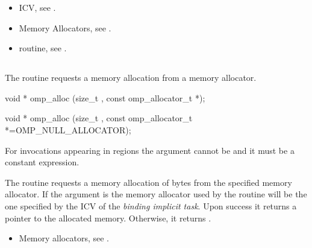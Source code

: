 \crossreferences
\begin{itemize}
\item {} ICV, see .
\item Memory Allocators, see .
\item {} routine, see .
\end{itemize}


\newpage %
\vspace{3\baselineskip}
\ccppspecificstart
\vspace{-3\baselineskip}
\subsection{}
\label{subsec:omp_alloc}

\summary
The  routine requests a memory allocation from a memory allocator.

\format
\begin{cspecific}
\begin{boxedcode}
void * omp_alloc (size_t , const omp_allocator_t *);
\end{boxedcode}
\end{cspecific}
\begin{cppspecific}
\begin{boxedcode}
void * omp_alloc (size_t , 
           const omp_allocator_t *=OMP_NULL_ALLOCATOR);
\end{boxedcode}
\end{cppspecific}

\constraints

For  invocations appearing in  regions the  argument cannot be  and it must be a constant expression.

\effect

The  routine requests a memory allocation of  bytes from the specified memory allocator. If the  argument is 
 the memory allocator used by the routine will be the one specified by the  ICV of the \emph{binding implicit task}.
Upon success it returns a pointer to the allocated memory. Otherwise, it returns .

\crossreferences
\begin{itemize}
\item Memory allocators, see .
\end{itemize}

